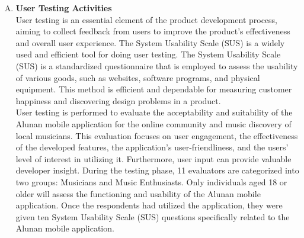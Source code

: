 \begin{enumerate}[A.]
    \item \textbf{User Testing Activities} \\
    User testing is an essential element of the product development process, aiming to collect feedback from users to improve the product's effectiveness and overall user experience. The System Usability Scale (SUS) is a widely used and efficient tool for doing user testing. The System Usability Scale (SUS) is a standardized questionnaire that is employed to assess the usability of various goods, such as websites, software programs, and physical equipment. This method is efficient and dependable for measuring customer happiness and discovering design problems in a product. \\

    User testing is performed to evaluate the acceptability and suitability of the Alunan mobile application for the online community and music discovery of local musicians. This evaluation focuses on user engagement, the effectiveness of the developed features, the application's user-friendliness, and the users' level of interest in utilizing it. Furthermore, user input can provide valuable developer insight. During the testing phase, 11 evaluators are categorized into two groups: Musicians and Music Enthusiasts. Only individuals aged 18 or older will assess the functioning and usability of the Alunan mobile application. Once the respondents had utilized the application, they were given ten System Usability Scale (SUS) questions specifically related to the Alunan mobile application.
    \clearpage


\end{enumerate}
